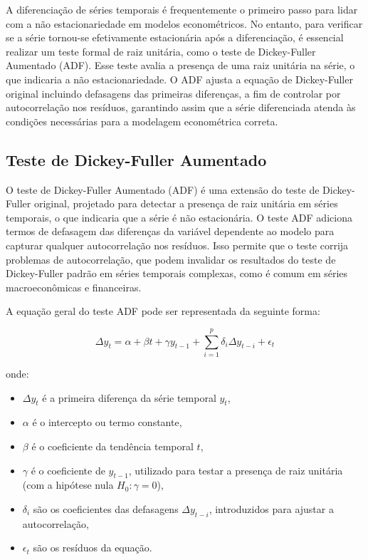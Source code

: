 \documentclass[12pt,oneside,a4paper,chapter=TITLE,english,brazil,sumario=abnt-6027-2012]{abntex2}
\begin{document}
A diferenciação de séries temporais é frequentemente o primeiro passo para lidar com a não estacionariedade em modelos econométricos. No entanto, para verificar se a série tornou-se efetivamente estacionária após a diferenciação, é essencial realizar um teste formal de raiz unitária, como o teste de Dickey-Fuller Aumentado (ADF). Esse teste avalia a presença de uma raiz unitária na série, o que indicaria a não estacionariedade. O ADF ajusta a equação de Dickey-Fuller original incluindo defasagens das primeiras diferenças, a fim de controlar por autocorrelação nos resíduos, garantindo assim que a série diferenciada atenda às condições necessárias para a modelagem econométrica correta.

\subsection{Teste de Dickey-Fuller Aumentado}

O teste de Dickey-Fuller Aumentado (ADF) é uma extensão do teste de Dickey-Fuller original, projetado para detectar a presença de raiz unitária em séries temporais, o que indicaria que a série é não estacionária. O teste ADF adiciona termos de defasagem das diferenças da variável dependente ao modelo para capturar qualquer autocorrelação nos resíduos. Isso permite que o teste corrija problemas de autocorrelação, que podem invalidar os resultados do teste de Dickey-Fuller padrão em séries temporais complexas, como é comum em séries macroeconômicas e financeiras.

A equação geral do teste ADF pode ser representada da seguinte forma:

\[
	\Delta y_t = \alpha + \beta t + \gamma y_{t-1} + \sum_{i=1}^{p} \delta_i \Delta y_{t-i} + \epsilon_t
\]

onde:

\begin{itemize}
	\item \( \Delta y_t \) é a primeira diferença da série temporal \( y_t \),
	\item \( \alpha \) é o intercepto ou termo constante,
	\item \( \beta \) é o coeficiente da tendência temporal \( t \),
	\item \( \gamma \) é o coeficiente de \( y_{t-1} \), utilizado para testar a presença de raiz unitária (com a hipótese nula \( H_0: \gamma = 0 \)),
	\item \( \delta_i \) são os coeficientes das defasagens \( \Delta y_{t-i} \), introduzidos para ajustar a autocorrelação,
	\item \( \epsilon_t \) são os resíduos da equação.
\end{itemize}
\end{document}
